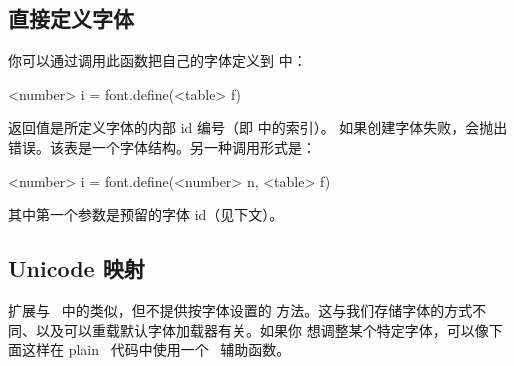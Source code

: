 \subsection{直接定义字体}


你可以通过调用此函数把自己的字体定义到  中：

\begin{typing}
<number> i =
    font.define(<table> f)
\end{typing}

返回值是所定义字体的内部 id 编号（即  中的索引）。
如果创建字体失败，会抛出错误。该表是一个字体结构。另一种调用形式是：

\begin{typing}
<number> i =
    font.define(<number> n, <table> f)
\end{typing}

其中第一个参数是预留的字体 id（见下文）。

\subsection{Unicode 映射}

 扩展与 \PDFTEX\ 中的类似，但不提供按字体设置的
方法。这与我们存储字体的方式不同、以及可以重载默认字体加载器有关。如果你
想调整某个特定字体，可以像下面这样在 plain \TEX\ 代码中使用一个
\LUA\ 辅助函数。


